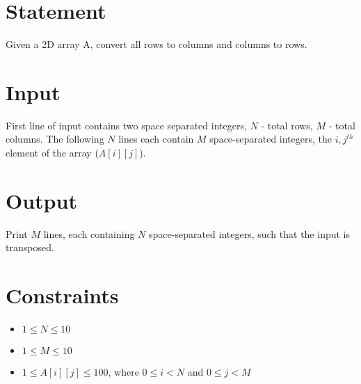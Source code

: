 \documentclass{article}
\begin{document}
\section*{Statement}

Given a 2D array A, convert all rows to columns and columns to rows.

\section*{Input}

First line of input contains two space separated integers, $N$ - total rows, $M$ - total columns. The following $N$ lines each contain $M$ space-separated integers, the $i,j^{th}$ element of the array ($A[i][j]$).

\section*{Output}

Print $M$ lines, each containing $N$ space-separated integers, such that the input is transposed.

\section*{Constraints}

\begin{itemize}
    \item $1 \le N \le 10$
    \item $1 \le M \le 10$
    \item $1 \le A[i][j] \le 100$, where $0 \le i < N$ and $0 \le j < M$
\end{itemize}
\end{document}
